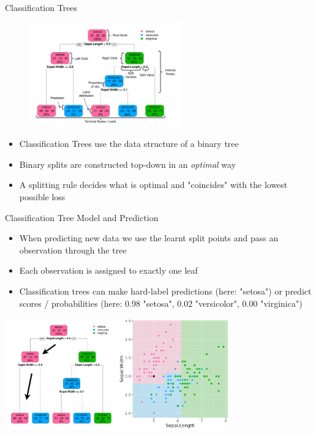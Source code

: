 \documentclass[11pt,compress,t,notes=noshow, xcolor=table]{beamer}
\begin{document}
\begin{vbframe}{Classification Trees}
    \begin{figure}
    \centering
      \includegraphics[height = 4.5cm, keepaspectratio]{figure/cart_intro_annotated-tree.pdf}
    \end{figure}
  \begin{itemize}
    \item Classification Trees use the data structure of a binary tree
    \item Binary splits are constructed top-down in an \emph{optimal} way
    \item A splitting rule decides what is optimal and "coincides" with the lowest possible loss
  \end{itemize}
\end{vbframe}


\begin{vbframe}{Classification Tree Model and Prediction}
\begin{itemize}
\item When predicting new data we use the learnt split points and pass an observation through the tree
\item Each observation is assigned to exactly one leaf
\item Classification trees can make hard-label predictions (here: "setosa") or predict scores / probabilities (here: 0.98 "setosa", 0.02 "versicolor", 0.00 "virginica")
\end{itemize}

\color{fgcolor}
{\centering \includegraphics[width=0.73\textwidth, keepaspectratio]{figure/no-points-classif-depth3.pdf}

}
\end{vbframe}
\end{document}
